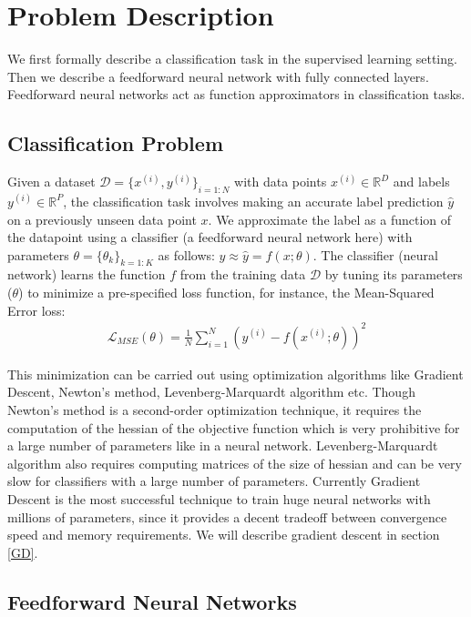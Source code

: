 \section{Problem Description}
\label{ProbDesc}

We first formally describe a classification task in the supervised learning setting. Then we describe a feedforward neural network with fully connected layers. Feedforward neural networks act as function approximators in classification tasks.

\subsection{Classification Problem}
\label{sub:ClassProb}

Given a dataset $\mathcal{D} = \{x^{(i)},y^{(i)}\}_{i=1:N}$ with data points $x^{(i)} \in \mathbb{R}^D$ and labels $y^{(i)} \in \mathbb{R}^P$, the classification task involves making an accurate label prediction $\hat{y}$ on a previously unseen data point $x$. We approximate the label as a function of the datapoint using a classifier (a feedforward neural network here) with parameters $\theta = \{\theta_k\}_{k=1:K}$ as follows: $y \approx \hat{y} = f(x; \theta)$.
The classifier (neural network) learns the function $f$ from the training data $\mathcal{D}$ by tuning its parameters ($\theta$) to minimize a pre-specified loss function, for instance, the Mean-Squared Error loss:
\begin{align} \label{LMSE}
\mathcal{L}_{MSE} (\theta) = \frac{1}{N}\sum_{i=1}^N ( y^{(i)} - f(x^{(i)}; \theta))^2
\end{align}

This minimization can be carried out using optimization algorithms like Gradient Descent, Newton's method, Levenberg-Marquardt algorithm etc.
Though Newton's method is a second-order optimization technique, it requires the computation of the hessian of the objective function which is very prohibitive for a large number of parameters like in a neural network.
Levenberg-Marquardt algorithm also requires computing matrices of the size of hessian and can be very slow for classifiers with a large number of parameters.
Currently Gradient Descent is the most successful technique to train huge neural networks with millions of parameters, since it provides a decent tradeoff between convergence speed and memory requirements.
We will describe gradient descent in section \ref{GD}.

\subsection{Feedforward Neural Networks}
\label{sub:FNN}

